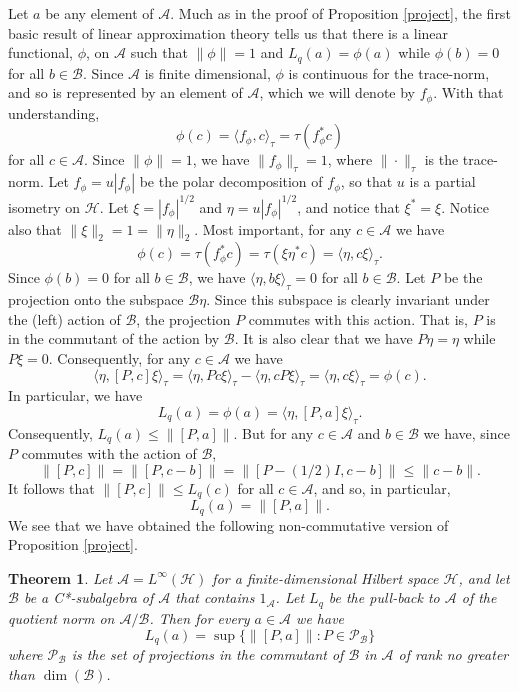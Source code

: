 \documentclass{amsart}[14pt]
\newtheorem{theorem}{Theorem}[section]
\theoremstyle{definition}
\theoremstyle{remark}
\newcommand{\cA}{{\mathcal A}}
\newcommand{\cB}{{\mathcal B}}
\newcommand{\cH}{{\mathcal H}}
\newcommand{\cP}{{\mathcal P}}
\newcommand{\<}{\langle}
\renewcommand{\>}{\rangle}
\numberwithin{equation}{section}
\begin{document}
{Let $a$ be any element of $\cA$. Much as in the proof 
of Proposition \ref{project}, the first basic result of linear
approximation theory tells us that there is a linear
functional, $\phi$, on $\cA$ such that $ \|\phi\| = 1$
and $L_q(a) = \phi(a)$
while $\phi(b)= 0$ for all $b \in \cB$. 
Since $ \cA$ is finite dimensional, $\phi$ is 
continuous for the trace-norm, and so is represented 
by an element of $\cA$, which we will denote
by $f_\phi$. With that understanding, 
\[
\phi(c) = \< f_\phi, c\>_\tau = \tau(f_\phi^*c)
\]
for all $c \in \cA$. Since $\|\phi\| = 1$, we have $\|f_\phi\|_\tau = 1$,
where $\|\cdot\|_\tau$ is the trace-norm. Let $f_\phi = u|f_\phi|$ be
the polar decomposition of $f_\phi$, so that $u$ is a partial isometry
on $\cH$.
Let $\xi = |f_\phi|^{1/2}$ and $\eta = u|f_\phi|^{1/2}$, and notice
that $\xi^* = \xi$. Notice also that $\|\xi\|_2 = 1 = \|\eta\|_2$.
Most important, for any $c \in \cA$ we have
\[
\phi(c) =  \tau(f_\phi^*c) = \tau(\xi\eta^*c) = \<\eta, c\xi\>_\tau  .
\]
Since $\phi(b) = 0$ for all $b \in \cB$, we have
$\<\eta, b\xi\>_\tau = 0 $ for all $b \in \cB$. Let $P$
be the projection onto the subspace $\cB \eta$. Since this
subspace is clearly invariant under the (left) action of
$\cB$, the projection $P$ commutes with this action.
That is, $P$ is in the commutant of the action by $\cB$.
It is also clear that we have $P\eta = \eta$ while $P\xi = 0$. 
Consequently, for any $c \in \cA$ we have
\[
\< \eta, [P, c]\xi \>_\tau =  \<\eta, Pc\xi\>_\tau - \<\eta, cP\xi\>_\tau
=  \<\eta, c\xi\>_\tau = \phi(c)   . 
\]
In particular, we have
\[
L_q(a) = \phi(a) = \< \eta, [P, a]\xi \>_\tau   .
\]
Consequently, $L_q(a) \leq \| [P,a] \|$. But for any $c \in \cA$
and $b \in  \cB$ we have, since $P$ commutes with the
action of $\cB$,  
\[
\| [P,c] \| = \| [P, c-b] \| = \| [P - (1/2)I, c-b] \| \leq \|c-b\|  . 
\]
It follows that $\| [P,c] \| \leq L_q(c)$ for all $c \in \cA$,
and so, in particular, 
\[
L_q(a) = \| [P,a] \| .
\]
We see that we have obtained the following non-commutative
version of Proposition \ref{project}.

\begin{theorem}
\label{commutant}
Let $\cA = L^\infty(\cH)$ for a finite-dimensional Hilbert space
$\cH$, and let $\cB$ be a C*-subalgebra of $\cA$ that contains
$1_\cA$. Let $L_q$ be the pull-back to $\cA$ of the quotient norm
on $\cA/\cB$. Then for every $a \in \cA$ we have
\[
L_q(a) = \sup \{\| [P,a] \|: P \in \cP_\cB \}
\]
where $\cP_\cB$ is the set of projections in the
commutant of $\cB$ in $\cA$ of
rank no greater than $\dim(\cB)$.
\end{theorem}

}
\end{document}
